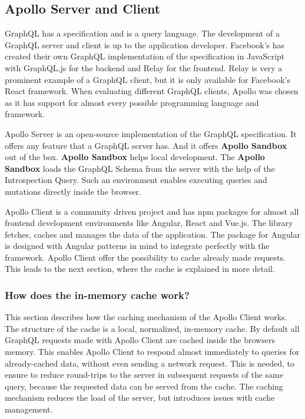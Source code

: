 \subsection{Apollo Server and Client}

GraphQL has a specification and is a query language. The development of a GraphQL server and client is up to the application developer. Facebook's has created their own GraphQL implementation of the specification in JavaScript with GraphQL.js for the backend and Relay for the frontend. Relay is very a prominent example of a GraphQL client, but it is only available for Facebook's React framework. When evaluating different GraphQL clients, Apollo was chosen as it has support for almost every possible programming language and framework.

Apollo Server is an open-source implementation of the GraphQL specification. It offers any feature that a GraphQL server has. And it offers \textbf{Apollo Sandbox} out of the box. \cite{misc:-:background:graphql:apollo-server-introduction} \textbf{Apollo Sandbox} helps local development. The \textbf{Apollo Sandbox} loads the GraphQL Schema from the server with the help of the Introspection Query. \cite{misc:-:background:graphql:apollo-sandbox} Such an environment enables executing queries and mutations directly inside the browser. 

Apollo Client is a community driven project and has npm packages for almost all frontend development environments like Angular, React and Vue.js. The library fetches, caches and manages the data of the application. The package for Angular is designed with Angular patterns in mind to integrate perfectly with the framework. Apollo Client offer the possibility to cache already made requests. \cite{misc:-:background:graphql:apollo-angular-client-overview} \cite{misc:-:background:graphql:apollo-client-overview} This leads to the next section, where the cache is explained in more detail.

\subsubsection{How does the in-memory cache work?}

This section describes how the caching mechanism of the Apollo Client works. The structure of the cache is a local, normalized, in-memory cache. By default all GraphQL requests made with Apollo Client are cached inside the browsers memory. This enables Apollo Client to respond almost immediately to queries for already-cached data, without even sending a network request. This is needed, to ensure to reduce round-trips to the server in subsequent requests of the same query, because the requested data can be served from the cache. \cite{misc:-:background:graphql:apollo-client-cache-overview} The caching mechanism reduces the load of the server, but introduces issues with cache management. 


